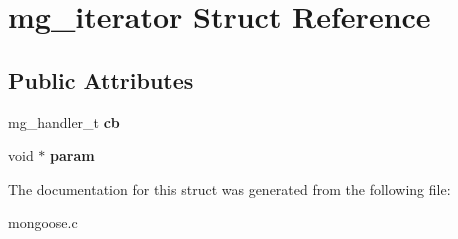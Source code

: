 \hypertarget{structmg__iterator}{\section{mg\-\_\-iterator Struct Reference}
\label{structmg__iterator}
}
\subsection*{Public Attributes}
\begin{DoxyCompactItemize}
\item 
\hypertarget{structmg__iterator_a3da164e715d23835e6c0f21021609c8f}{mg\-\_\-handler\-\_\-t {\bfseries cb}}\label{structmg__iterator_a3da164e715d23835e6c0f21021609c8f}

\item 
\hypertarget{structmg__iterator_a2bb79d73d4b904aa92e89ddd77233dc7}{void $\ast$ {\bfseries param}}\label{structmg__iterator_a2bb79d73d4b904aa92e89ddd77233dc7}

\end{DoxyCompactItemize}


The documentation for this struct was generated from the following file\-:\begin{DoxyCompactItemize}
\item 
mongoose.\-c\end{DoxyCompactItemize}
